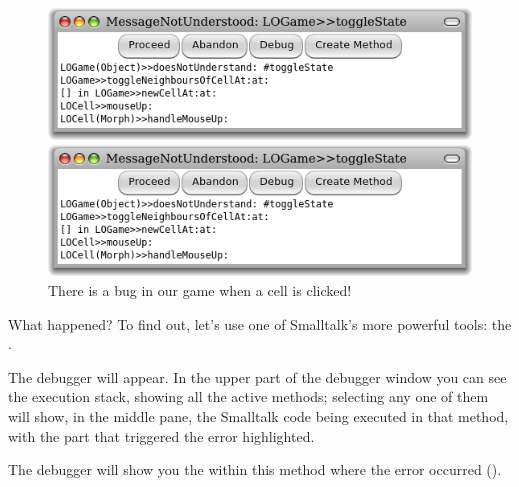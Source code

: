 \documentclass[a4paper,10pt,twoside]{book}
\begin{document}
\begin{figure}[ht]
\ifluluelse
	{\centerline{\includegraphics[width=\textwidth]{Error}}}
	{\centerline{\includegraphics[scale=0.7]{Error}}}
\caption{There is a bug in our game when a cell is clicked!
}
\end{figure}

\noindent
What happened? To find out, let's use one of Smalltalk's more powerful tools: the .

The debugger will appear.
In the upper part of the debugger window you can see the execution stack, showing all the active methods; selecting any one of them will show, in the middle pane, the Smalltalk code being executed in that method, with the part that triggered the error highlighted.

The debugger will show you the  within this method where the error occurred ().
\end{document}
